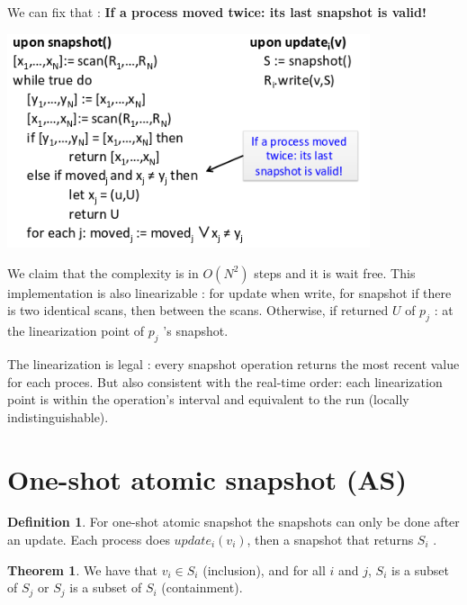 \documentclass{article}
\theoremstyle{definition}
\newtheorem{definition}{Definition}[section]
\newtheorem{theorem}{Theorem}
\begin{document}
We can fix that : \textbf{If a process moved twice: its last snapshot is valid!}
\begin{center}
\includegraphics[width=0.8\textwidth]{wait_free_snap_lin_corr}\\
\end{center}

We claim that the complexity  is in $O(N^2)$ steps and it is wait free. This implementation is also linearizable : for update when write, for snapshot if there is two identical scans, then between the scans. Otherwise, if returned $U$ of $p_j$ : at the linearization point of $p_j$ ’s snapshot.

The linearization is legal : every snapshot operation returns the most recent value for each proces. But also consistent with the real-time order: each linearization point is within the operation’s interval and equivalent to the run (locally indistinguishable).

\section{One-shot atomic snapshot (AS)}

\begin{definition}
For one-shot atomic snapshot the snapshots can only be done after an update. Each process does $update_i(v_i )$, then a snapshot that returns $S_i$ .
\end{definition}

\begin{theorem}
We have that $v_i \in S_i$ (inclusion), and for all $i$ and $j$, $S_i$ is a subset of $S_j$ or $S_j$ is a subset of $S_i$ (containment).
\end{theorem}
\end{document}
